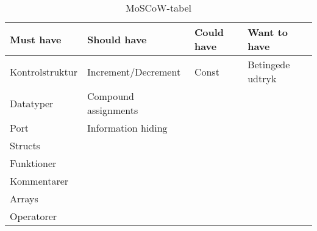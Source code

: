 %
%
\begin{table}[H]
\centering
\begin{tabular}{l|l|l|l}
\toprule
\textbf{Must have} & \textbf{Should have} & \textbf{Could have} & \textbf{Want to have} \\ \midrule
Kontrolstruktur & Increment/Decrement & Const & Betingede udtryk   \\ 
Datatyper & Compound assignments & & \\ 
Port & Information hiding & &	   \\ 
Structs	&  &  &		   \\ 
Funktioner &  &  & 		   \\ 
Kommentarer &  &  & 		   \\ 
Arrays &  &  & 	   \\ 
Operatorer &  &  & 		   \\ \bottomrule
 

 

\end{tabular}
\caption{MoSCoW-tabel}
\label{tab:moscow}
\end{table}

